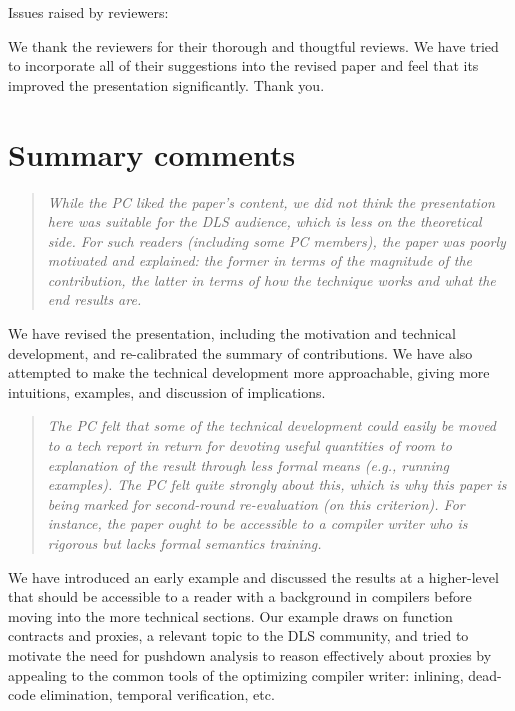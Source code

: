 \begin{titlepage}
  \begin{center}
    \Large{Issues raised by reviewers:}
  \end{center}


We thank the reviewers for their thorough and thougtful reviews.  We
have tried to incorporate all of their suggestions into the revised
paper and feel that its improved the presentation significantly.  Thank you.

\section*{Summary comments}

\begin{quote}
\emph{
While the PC liked the paper's content, we did not think the
presentation here was suitable for the DLS audience, which is less on
the theoretical side. For such readers (including some PC members),
the paper was poorly motivated and explained: the former in terms of
the magnitude of the contribution, the latter in terms of how the
technique works and what the end results are.}
\end{quote}

We have revised the presentation, including the motivation and
technical development, and re-calibrated the summary of contributions.
We have also attempted to make the technical development more
approachable, giving more intuitions, examples, and discussion of
implications.

\begin{quote}
\emph{
The PC felt that some of the technical development could easily be
moved to a tech report in return for devoting useful quantities of
room to explanation of the result through less formal means (e.g.,
running examples). The PC felt quite strongly about this, which is why
this paper is being marked for second-round re-evaluation (on this
criterion). For instance, the paper ought to be accessible to a
compiler writer who is rigorous but lacks formal semantics training.}
\end{quote}

We have introduced an early example and discussed the results at a
higher-level that should be accessible to a reader with a background
in compilers before moving into the more technical sections.  Our
example draws on function contracts and proxies, a relevant topic to
the DLS community, and tried to motivate the need for pushdown
analysis to reason effectively about proxies by appealing to the
common tools of the optimizing compiler writer: inlining, dead-code
elimination, temporal verification, etc.


\end{titlepage}
